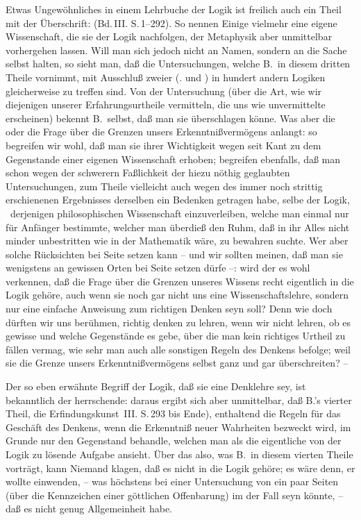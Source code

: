 Etwas Ungewöhnliches in einem Lehrbuche der Logik ist freilich auch ein Theil mit der Überschrift:  (Bd.\,III. S.\,1--292). So nennen Einige vielmehr eine eigene Wissenschaft, die sie der Logik nachfolgen, der Metaphysik aber unmittelbar vorhergehen lassen. Will man sich jedoch nicht an Namen, sondern an die Sache selbst halten, so sieht man, daß die Untersuchungen, welche B.\ in diesem dritten Theile vornimmt, mit Ausschluß zweier (. und ) in hundert andern Logiken gleicherweise zu treffen sind. Von der Untersuchung  (über die Art, wie wir diejenigen unserer Erfahrungsurtheile vermitteln, die uns wie unvermittelte erscheinen) bekennt B.\ selbst, daß man sie überschlagen könne. Was aber die  oder die Frage über die Grenzen unsers Erkenntnißvermögens anlangt: so begreifen wir wohl, daß man sie ihrer Wichtigkeit wegen seit Kant zu dem Gegenstande einer eigenen Wissenschaft erhoben; begreifen ebenfalls, daß man schon wegen der schwerern Faßlichkeit der hiezu nöthig geglaubten Untersuchungen, zum Theile vielleicht auch wegen des immer noch strittig erschienenen Ergebnisses derselben ein Bedenken getragen habe, selbe der Logik, \dh\  derjenigen philosophischen Wissenschaft einzuverleiben, welche man einmal nur für Anfänger bestimmte, welcher man überdieß den Ruhm, daß in ihr Alles nicht minder unbestritten wie in der Mathematik wäre, zu bewahren suchte. Wer aber solche Rücksichten bei Seite setzen kann -- und wir sollten meinen, daß man sie wenigstens an gewissen Orten bei Seite setzen dürfe --: wird der es wohl verkennen, daß die Frage über die Grenzen unseres Wissens recht eigentlich in die Logik gehöre, auch wenn sie noch gar nicht uns eine Wissenschaftslehre, sondern nur eine einfache Anweisung zum richtigen Denken seyn soll? Denn wie doch dürften wir uns berühmen, richtig denken zu lehren, wenn wir nicht lehren, ob es gewisse und welche Gegenstände es gebe, über die man kein richtiges Urtheil zu fällen vermag, wie sehr man auch alle sonstigen Regeln des Denkens befolge;  weil sie die Grenze unsers Erkenntnißvermögens selbst ganz und gar überschreiten? --\par
Der so eben erwähnte Begriff der Logik, daß sie eine Denklehre sey, ist bekanntlich der herrschende: daraus ergibt sich aber unmittelbar, daß B.'s vierter Theil, die Erfindungskunst \,III. S.\,293 bis Ende), enthaltend die Regeln für das Geschäft des Denkens, wenn die Erkenntniß neuer Wahrheiten bezweckt wird, im Grunde nur den Gegenstand behandle, welchen man als die eigentliche von der Logik zu lösende Aufgabe ansieht. Über das also, was B.\ in diesem vierten Theile vorträgt, kann Niemand klagen, daß es nicht in die Logik gehöre; es wäre denn, er wollte einwenden, -- was höchstens bei einer Untersuchung von ein paar Seiten (über die Kennzeichen einer göttlichen Offenbarung) im  der Fall seyn könnte, -- daß es nicht genug Allgemeinheit habe. \par
